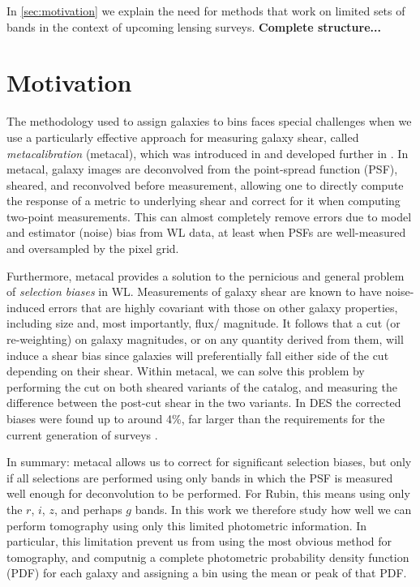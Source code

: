 \documentclass[twocolumn,twocolappendix]{aastex63}
\begin{document}
In \autoref{sec:motivation} we explain the need for methods that work on limited sets of bands in the context of upcoming lensing surveys.  \textbf{Complete structure...}

\section{Motivation}
\label{sec:motivation}

The methodology used to assign galaxies to bins faces special challenges when we use a particularly
effective approach for measuring galaxy shear, called \emph{metacalibration} (metacal),
which was introduced in \citet{sheldonhuff} and developed further in \citet{sheldon}.
In metacal, galaxy images are deconvolved from the point-spread function (PSF), sheared, and
reconvolved before measurement, allowing one to directly compute the response of a metric
to underlying shear and correct for it when computing two-point measurements.  This can
almost completely remove errors due to model and estimator (noise) bias from WL data, at least
when PSFs are well-measured and oversampled by the pixel grid.

Furthermore, metacal provides a solution to the pernicious and general problem of
\emph{selection biases} in WL.  Measurements of galaxy shear are known to have noise-induced errors
that are
highly covariant with those on other galaxy properties, including size and, most importantly, flux/
magnitude.  It follows that a cut (or re-weighting) on galaxy magnitudes, or on any quantity derived
from  them, will induce a shear bias since galaxies will preferentially fall either side of the cut
depending on their shear.  Within metacal, we can solve this problem by performing the cut on both
sheared variants of the catalog, and measuring the difference between the post-cut shear in the two
variants.  In DES the corrected biases were found up to around 4\%, far larger than
the requirements for the current generation of surveys \citep{des-y1-cat}.

In summary: metacal allows us to correct for significant selection biases, but only if all selections
are performed using only bands in which the PSF is measured well enough for deconvolution to be
performed.  For Rubin, this means using only the $r$, $i$, $z$, and perhaps $g$ bands.  In this work we
therefore study how well we can perform tomography using only this limited photometric information.  In
particular, this limitation prevent us from using the most obvious method for tomography,
and computnig a complete photometric probability density function (PDF) for each galaxy and assigning
a bin using the mean or peak of that PDF.
\end{document}
